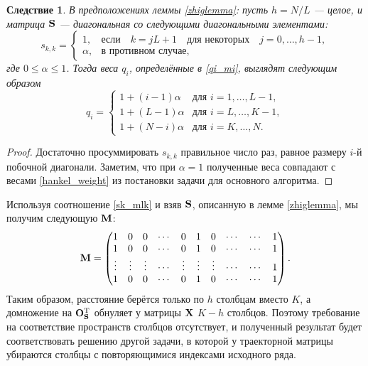 \documentclass[12pt,a4paper,fleqn,leqno]{article}
\begin{document}
\newtheorem{consequence}{Следствие}
\begin{consequence}\label{zhigconseq}
В предположениях леммы \ref{zhiglemma}: пусть $h = N/L$ --- целое, и матрица $\mathbf{S}$ --- диагональная со следующими диагональными элементами:
\begin{equation}\label{zhigweights}
s_{k,k} = \begin{cases}
1, & \text{если} \quad k = jL+1 \quad \text{для некоторых} \quad j = 0, \ldots, h-1, \\
\alpha, & \text{в противном случае,}
\end{cases}
\end{equation}
где $0 \le \alpha \le 1$. Тогда веса $q_i$, определённые в \eqref{qi_mi}, выглядят следующим образом
\begin{equation*}
q_i = \begin{cases}
1 + (i - 1) \alpha & \text{для $i = 1, \ldots, L-1,$}\\
1 + (L - 1) \alpha & \text{для $i = L, \ldots, K-1,$}\\
1 + (N - i) \alpha & \text{для $i = K, \ldots, N.$}
\end{cases}
\end{equation*}
\end{consequence}
\begin{proof}
Достаточно просуммировать $s_{k,k}$ правильное число раз, равное размеру $i$-й побочной диагонали. Заметим, что при $\alpha = 1$ полученные веса совпадают с весами \eqref{hankel_weight} из постановки задачи для основного алгоритма.
\end{proof}

Используя соотношение \eqref{sk_mlk} и взяв $\mathbf{S}$, описанную в лемме \ref{zhiglemma}, мы получим следующую $\mathbf{M}$:
\begin{equation*}
\mathbf{M} = \begin{pmatrix}

1 & 0 & 0 & \cdots & 0 & 1 & 0 & \cdots & \cdots & 1 \\
1 & 0 & 0 & \cdots & 0 & 1 & 0 & \cdots & \cdots & 1 \\
\vdots & \vdots & \vdots & \cdots & \vdots & \vdots & \vdots & \cdots & \cdots & 1 \\
1 & 0 & 0 & \cdots & 0 & 1 & 0 & \cdots & \cdots & 1
\end{pmatrix}.
\end{equation*}
Таким образом, расстояние берётся только по $h$ столбцам вместо $K$, а домножение на $\mathbf{O}_{\mathbf{S}}^{\mathrm{T}}$ обнуляет у матрицы $\mathbf{X}$ $K - h$ столбцов. Поэтому требование на соответствие пространств столбцов отсутствует, и полученный результат будет соответствовать решению другой задачи, в которой у траекторной матрицы убираются столбцы с повторяющимися индексами исходного ряда.
\end{document}
